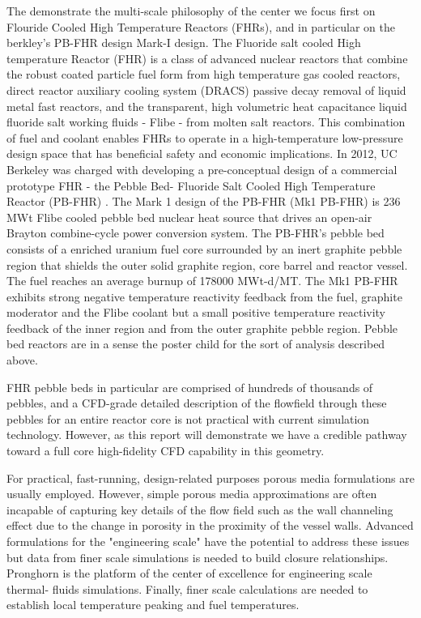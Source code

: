 The demonstrate the multi-scale philosophy of the center we focus first on Flouride Cooled High Temperature Reactors (FHRs), and in particular on the berkley's PB-FHR design Mark-I design. The Fluoride salt cooled High temperature Reactor (FHR) is a class of advanced nuclear reactors that combine the robust coated particle fuel form from high temperature gas cooled reactors, direct reactor auxiliary cooling system (DRACS) passive decay removal of liquid metal fast reactors, and the transparent, high volumetric heat capacitance liquid fluoride salt working fluids - Flibe - from molten salt reactors. This combination of fuel and coolant enables FHRs to operate in a high-temperature low-pressure design space that has beneficial safety and economic implications. In 2012, UC Berkeley was charged with developing a pre-conceptual design of a commercial prototype FHR - the Pebble Bed- Fluoride Salt Cooled High Temperature Reactor (PB-FHR) \cite{cisneros2014technical}. The Mark 1 design of the PB-FHR (Mk1 PB-FHR) is 236 MWt Flibe cooled pebble bed nuclear heat source that drives an open-air Brayton combine-cycle power conversion system. The PB-FHR's pebble bed consists of a enriched uranium fuel core surrounded by an inert graphite pebble region that shields the outer solid graphite region, core barrel and reactor vessel. The fuel reaches an average burnup of 178000 MWt-d/MT. The Mk1 PB-FHR exhibits strong negative temperature reactivity feedback from the fuel, graphite moderator and the Flibe coolant but a small positive temperature reactivity feedback of the inner region and from the outer graphite pebble region. Pebble bed reactors are in a sense the poster child for the sort of analysis described above.

FHR pebble beds in particular are comprised of hundreds of thousands of pebbles, and a CFD-grade detailed description of the flowfield through these pebbles for an entire reactor core is not practical with current simulation technology. However, as this report will demonstrate we have a credible pathway toward a full core high-fidelity CFD capability in this geometry.

For practical, fast-running, design-related purposes porous media formulations are usually employed. However, simple porous media approximations are often incapable of capturing key details of the flow field such as the wall channeling effect due to the change in porosity in the proximity of the vessel walls.  Advanced formulations for the "engineering scale" have the potential to address these issues but data from finer scale simulations is needed to build closure relationships. Pronghorn is the platform of the center of excellence for engineering scale thermal- fluids simulations. Finally, finer scale calculations are needed to establish local temperature peaking and fuel temperatures.

